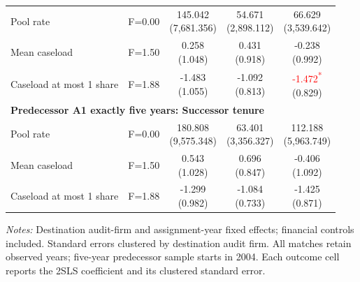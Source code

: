 \documentclass[10pt]{article}
\newcommand{\sym}[1]{\textsuperscript{#1}}
\begin{document}
\begin{minipage}{19cm}
\begin{threeparttable}
\begin{tabular}{p{}cccc}
Pool rate & F=0.00 & \shortstack{145.042\\(7,681.356)} & \shortstack{54.671\\(2,898.112)} & \shortstack{66.629\\(3,539.642)} \\
Mean caseload & F=1.50 & \shortstack{0.258\\(1.048)} & \shortstack{0.431\\(0.918)} & \shortstack{-0.238\\(0.992)} \\
Caseload at most 1 share & F=1.88 & \shortstack{-1.483\\(1.055)} & \shortstack{-1.092\\(0.813)} & \shortstack{\textcolor{red}{-1.472\sym{*}}\\(0.829)} \\
\multicolumn{5}{l}{\textbf{Predecessor A1 exactly five years: Successor tenure}} \\
Pool rate & F=0.00 & \shortstack{180.808\\(9,575.348)} & \shortstack{63.401\\(3,356.327)} & \shortstack{112.188\\(5,963.749)} \\
Mean caseload & F=1.50 & \shortstack{0.543\\(1.028)} & \shortstack{0.696\\(0.847)} & \shortstack{-0.406\\(1.092)} \\
Caseload at most 1 share & F=1.88 & \shortstack{-1.299\\(0.982)} & \shortstack{-1.084\\(0.733)} & \shortstack{-1.425\\(0.871)} \\
\bottomrule
\end{tabular}
\begin{tablenotes}\fontsize{9}{11}\selectfont
\item \raggedright \fontsize{9}{11}\selectfont \textit{Notes:} Destination audit-firm and assignment-year fixed effects; financial controls included. Standard errors clustered by destination audit firm. All matches retain observed years; five-year predecessor sample starts in 2004. Each outcome cell reports the 2SLS coefficient and its clustered standard error.
\end{tablenotes}
\end{threeparttable}

\end{minipage}
\end{document}
